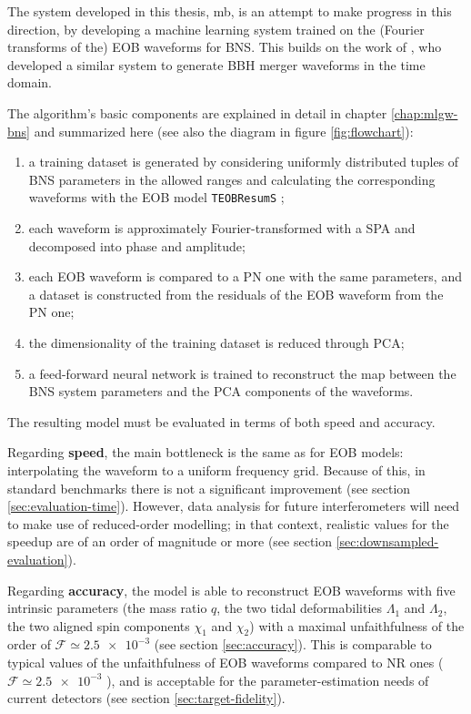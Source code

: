 \documentclass[main.tex]{subfiles}
\begin{document}
The system developed in this thesis, \ac{mb}, is an attempt to make progress in this direction, by developing a machine learning system trained on the (Fourier transforms of the) \ac{EOB} waveforms for \ac{BNS}. 
This builds on the work of \textcite{schmidtMachineLearningGravitational2020}, who developed a similar system to generate \ac{BBH} merger waveforms in the time domain.

The algorithm's basic components are explained in detail in chapter \ref{chap:mlgw-bns} and summarized here (see also the diagram in figure \ref{fig:flowchart}):
\begin{enumerate}
    \item a training dataset is generated by considering uniformly distributed tuples of \ac{BNS} parameters in the allowed ranges and calculating the corresponding waveforms with the \ac{EOB} model \texttt{TEOBResumS} \cite[]{nagarTimedomainEffectiveonebodyGravitational2018};
    \item each waveform is approximately Fourier-transformed with a \ac{SPA} \cite[]{gambaFastFaithfulFrequencydomain2020} and decomposed into phase and amplitude;
    \item each \ac{EOB} waveform is compared to a \ac{PN} one with the same parameters, and a dataset is constructed from the residuals of the \ac{EOB} waveform from the \ac{PN} one;
    \item the dimensionality of the training dataset is reduced through \ac{PCA};
    \item a feed-forward neural network is trained to reconstruct the map between the \ac{BNS} system parameters and the \ac{PCA} components of the waveforms. 
\end{enumerate}

The resulting model must be evaluated in terms of both speed and accuracy.

Regarding \textbf{speed}, the main bottleneck is the same as for \ac{EOB} models: interpolating the waveform to a uniform frequency grid. 
Because of this, in standard benchmarks there is not a significant improvement (see section \ref{sec:evaluation-time}). 
However, data analysis for future interferometers will need to make use of reduced-order modelling; in that context, realistic values for the  speedup are of an order of magnitude or more (see section \ref{sec:downsampled-evaluation}). 

Regarding \textbf{accuracy}, the model is able to reconstruct \ac{EOB} waveforms with five intrinsic parameters (the mass ratio \(q\), the two tidal deformabilities \(\Lambda_1\) and \(\Lambda_2 \), the two aligned spin components \(\chi_1 \) and \(\chi_2 \)) with a maximal unfaithfulness of the order of \(\mathcal{F} \simeq \num{2.5e-3}\) (see section \ref{sec:accuracy}).
This is comparable to typical values of the unfaithfulness of EOB waveforms compared to \ac{NR} ones (\(\mathcal{F} \simeq \num{2.5e-3}\) \cite{nagarTimedomainEffectiveonebodyGravitational2018}), and is acceptable for the parameter-estimation needs of current detectors (see section \ref{sec:target-fidelity}).
\end{document}
